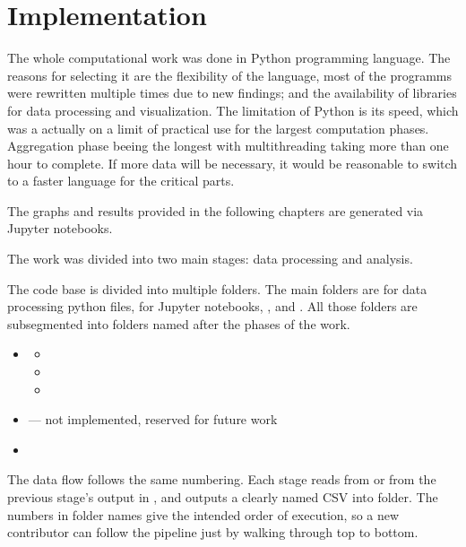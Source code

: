 
\chapter{Implementation}


The whole computational work was done in Python programming language. The reasons for selecting it are the flexibility of the language, most of the programms were rewritten multiple times due to new findings; and the availability of libraries for data processing and visualization. The limitation of Python is its speed, which was a actually on a limit of practical use for the largest computation phases. Aggregation phase beeing the longest with multithreading taking more than one hour to complete. If more data will be necessary, it would be reasonable to switch to a faster language for the critical parts.

The graphs and results provided in the following chapters are generated via Jupyter notebooks.

The work was divided into two main stages: data processing and analysis.

The code base is divided into multiple folders. The main folders are  for data processing python files,  for Jupyter notebooks, ,  and . All those folders are subsegmented into folders named after the phases of the work. 

\begin{itemize}
    \item {}
    \begin{itemize}
        \item {}
        \item {}
        \item {}
    \end{itemize}
    \item {} --- not implemented, reserved for future work
    \item {}
\end{itemize}

The data flow follows the same numbering. Each stage reads from  or from the previous stage's output in , and outputs a clearly named CSV into  folder. The numbers in folder names give the intended order of execution, so a new contributor can follow the pipeline just by walking through  top to bottom.

